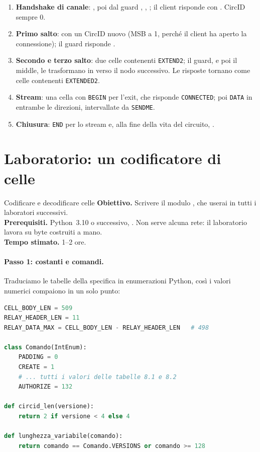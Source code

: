 \begin{enumerate}
  \item \textbf{Handshake di canale}: , poi dal guard , , ; il client risponde con . CircID sempre 0.
  \item \textbf{Primo salto}:  con un CircID nuovo (MSB a 1, perché il client ha aperto la connessione); il guard risponde .
  \item \textbf{Secondo e terzo salto}: due celle  contenenti \texttt{EXTEND2}; il guard, e poi il middle, le trasformano in  verso il nodo successivo. Le risposte tornano come celle  contenenti \texttt{EXTENDED2}.
  \item \textbf{Stream}: una cella con \texttt{BEGIN} per l'exit, che risponde \texttt{CONNECTED}; poi \texttt{DATA} in entrambe le direzioni, intervallate da \texttt{SENDME}.
  \item \textbf{Chiusura}: \texttt{END} per lo stream e, alla fine della vita del circuito, .
\end{enumerate}

\section{Laboratorio: un codificatore di celle}\label{sec:lab-celle}

\begin{laboratorio}[2]{Codificare e decodificare celle}
\textbf{Obiettivo.} Scrivere il modulo , che userai in tutti i laboratori successivi.\\
\textbf{Prerequisiti.} Python~3.10 o successivo, . Non serve alcuna rete: il laboratorio lavora su byte costruiti a mano.\\
\textbf{Tempo stimato.} 1--2 ore.
\end{laboratorio}

\paragraph{Passo 1: costanti e comandi.} Traduciamo le tabelle della specifica in enumerazioni Python, così i valori numerici compaiono in un solo punto:

\begin{lstlisting}[language=Python]
CELL_BODY_LEN = 509
RELAY_HEADER_LEN = 11
RELAY_DATA_MAX = CELL_BODY_LEN - RELAY_HEADER_LEN   # 498

class Comando(IntEnum):
    PADDING = 0
    CREATE = 1
    # ... tutti i valori delle tabelle 8.1 e 8.2
    AUTHORIZE = 132

def circid_len(versione):
    return 2 if versione < 4 else 4

def lunghezza_variabile(comando):
    return comando == Comando.VERSIONS or comando >= 128
\end{lstlisting}

